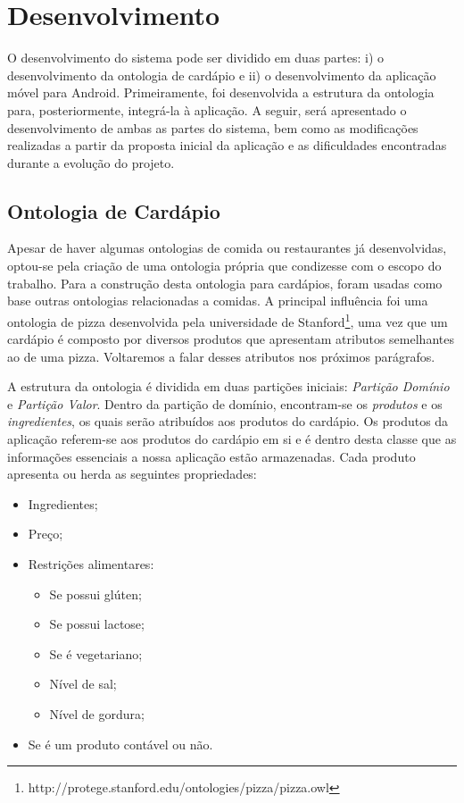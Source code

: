 \chapter{\label{chap:desenvolvimento}Desenvolvimento}

O desenvolvimento do sistema pode ser dividido em duas partes: i) o desenvolvimento da ontologia de cardápio e ii) o desenvolvimento da aplicação móvel para Android. Primeiramente, foi desenvolvida a estrutura da ontologia para, posteriormente, integrá-la à aplicação. A seguir, será apresentado o desenvolvimento de ambas as partes do sistema, bem como as modificações realizadas a partir da proposta inicial da aplicação e as dificuldades encontradas durante a evolução do projeto.

\section{\label{sec:ontologia}Ontologia de Cardápio}

Apesar de haver algumas ontologias de comida ou restaurantes já desenvolvidas, optou-se pela criação de uma ontologia própria que condizesse com o escopo do trabalho. Para a construção desta ontologia para cardápios, foram usadas como base outras ontologias relacionadas a comidas. A principal influência foi uma ontologia de pizza desenvolvida pela universidade de Stanford\footnote{http://protege.stanford.edu/ontologies/pizza/pizza.owl}, uma vez que um cardápio é composto por diversos produtos que apresentam atributos semelhantes ao de uma pizza. Voltaremos a falar desses atributos nos próximos parágrafos.

A estrutura da ontologia é dividida em duas partições iniciais: \emph{Partição Domínio} e \emph{Partição Valor}. Dentro da partição de domínio, encontram-se os \emph{produtos} e os \emph{ingredientes}, os quais serão atribuídos aos produtos do cardápio. Os produtos da aplicação referem-se aos produtos do cardápio em si e é dentro desta classe que as informações essenciais a nossa aplicação estão armazenadas. Cada produto apresenta ou herda as seguintes propriedades:
\begin{itemize}
	\item Ingredientes;
	\item Preço;
	\item Restrições alimentares:
	\begin{itemize}
		\item Se possui glúten;
		\item Se possui lactose;
		\item Se é vegetariano;
		\item Nível de sal;
		\item Nível de gordura;
	\end{itemize}
	\item Se é um produto contável ou não.
\end{itemize}

